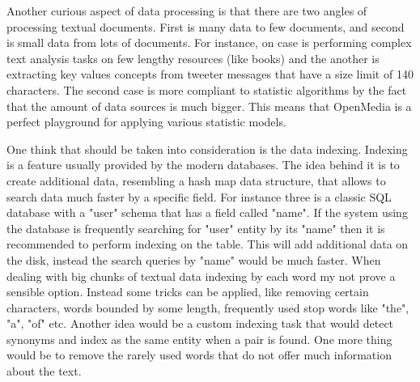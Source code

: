 Another curious aspect of data processing is that there are two angles of processing textual documents. First is many data to few documents, and second is small data from lots of documents. For instance, on case is performing complex text analysis tasks on few lengthy resources (like books) and the another is extracting key values concepts from tweeter messages that have a size limit of 140 characters. The second case is more compliant to statistic algorithms by the fact that the amount of data sources is much bigger. This means that OpenMedia is a perfect playground for applying various statistic models.

One think that should be taken into consideration is the data indexing. Indexing is a feature usually provided by the modern databases. The idea behind it is to create additional data, resembling a hash map data structure, that allows to search data much faster by a specific field. For instance three is a classic SQL database with a "user" schema that has a field called "name". If the system using the database is frequently searching for "user" entity by its "name" then it is recommended to perform indexing on the table. This will add additional data on the disk, instead the search queries by "name" would be much faster. When dealing with big chunks of textual data indexing by each word my not prove a sensible option. Instead some tricks can be applied, like removing certain characters, words bounded by some length, frequently used stop words like "the", "a", "of" etc. Another idea would be a custom indexing task that would detect synonyms and index as the same entity when a pair is found. One more thing would be to remove the rarely used words that do not offer much information about the text.


